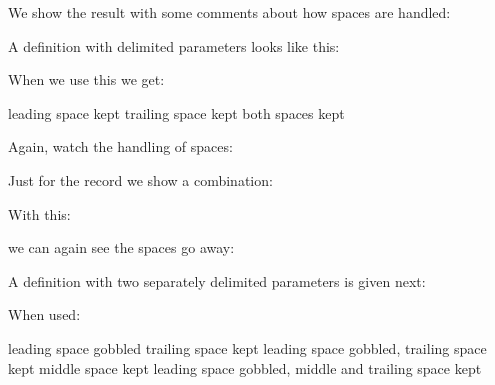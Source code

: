 \typebuffer[example][option=TEX]

We show the result with some comments about how spaces are handled:

\startlines \getbuffer[example] \stoplines

A definition with delimited parameters looks like this:

\startbuffer[definition]
\stopbuffer

\typebuffer[definition][option=TEX] \getbuffer[definition]

When we use this we get:

\startbuffer[example]
\macro [1]
\macro [ 1]    leading space kept
\macro [1 ]    trailing space kept
\macro [ 1 ]   both spaces kept
\stopbuffer

\typebuffer[example][option=TEX]

Again, watch the handling of spaces:

\startlines \getbuffer[example] \stoplines

Just for the record we show a combination:

\startbuffer[definition]
\stopbuffer

\typebuffer[definition][option=TEX] \getbuffer[definition]

With this:

\startbuffer[example]
\stopbuffer

\typebuffer[example][option=TEX]

we can again see the spaces go away:

\startlines \getbuffer[example] \stoplines

A definition with two separately delimited parameters is given next:

\startbuffer[definition]
\stopbuffer

\typebuffer[definition][option=TEX] \getbuffer[definition]

When used:

\startbuffer[example]
\macro [12]
\macro [ 12]     leading space gobbled
\macro [12 ]     trailing space kept
\macro [ 12 ]    leading space gobbled, trailing space kept
\macro [1 2]     middle space kept
\macro [ 1 2 ]   leading space gobbled, middle and trailing space kept
\stopbuffer

